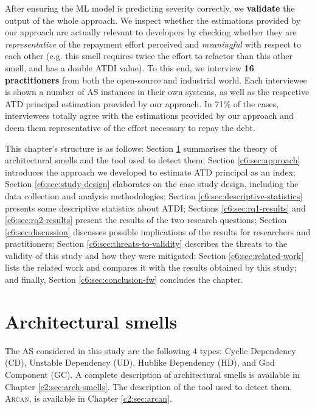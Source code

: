 After ensuring the ML model is predicting severity correctly, we \textbf{validate} the output of the whole approach. 
We inspect whether the estimations provided by our approach are actually relevant to developers by checking whether they are \emph{representative} of the repayment effort perceived and \emph{meaningful} with respect to each other (e.g. this smell requires twice the effort to refactor than this other smell, and has a double ATDI value).
To this end, we interview \textbf{16 practitioners} from both the open-source and industrial world.
Each interviewee is shown a number of AS instances in their own systems, as well as the respective ATD principal estimation provided by our approach.
In 71\% of the cases, interviewees totally agree with the estimations provided by our approach and deem them representative of the effort necessary to repay the debt.

This chapter's structure is as follows:
Section \ref{c6:sec:AS} summarises the theory of architectural smells and the tool used to detect them; Section \ref{c6:sec:approach} introduces the approach we developed to estimate ATD principal as an index; Section \ref{c6:sec:study-design} elaborates on the case study design, including the data collection and analysis methodologies; Section \ref{c6:sec:descriptive-statistics} presents some descriptive statistics about ATDI; Sections \ref{c6:sec:rq1-results} and \ref{c6:sec:rq2-results}  present the results of the two research questions; Section \ref{c6:sec:discussion} discusses possible implications of the results for researchers and practitioners; Section \ref{c6:sec:threats-to-validity} describes the threats to the validity of this study and how they were mitigated; Section \ref{c6:sec:related-work} lists the related work and compares it with the results obtained by this study; and finally, Section \ref{c6:sec:conclusion-fw} concludes the chapter.


\section{Architectural smells}\label{c6:sec:AS}
The AS considered in this study are the following 4 types: Cyclic Dependency (CD), Unstable Dependency (UD), Hublike Dependency (HD), and God Component (GC).
A complete description of architectural smells is available in Chapter \ref{c2:sec:arch-smells}.
The description of the tool used to detect them, \textsc{Arcan}, is available in Chapter \ref{c2:sec:arcan}.

